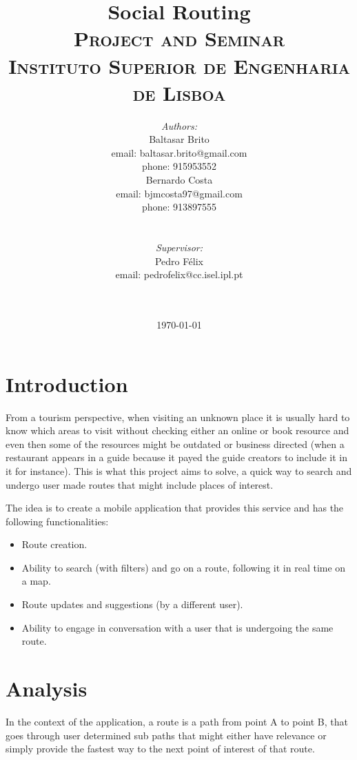 \documentclass{article}
\title{\vspace{-4.0cm}
    {\Huge Social Routing}\\[0.5cm]    
    \textsc{\Large Project and Seminar}\\[0.5cm]
    \textsc{\large Instituto Superior de Engenharia de Lisboa}\\[0.5cm]
}
\date{\today}
\author{   
    \begin{minipage}{0.4\textwidth}
        \begin{flushleft} \large
        \emph{Authors:}\\
        Baltasar Brito\\
        {\small email: baltasar.brito@gmail.com}\\
        {\small phone: 915953552}\\
        Bernardo Costa\\
        {\small email: bjmcosta97@gmail.com}\\
        {\small phone: 913897555}\\
        \end{flushleft}
    \end{minipage}
    ~
    \begin{minipage}{0.4\textwidth}
        \begin{flushright} \large
        \emph{Supervisor:} \\ 
        Pedro Félix\\
        {\small email: pedrofelix@cc.isel.ipl.pt}\\  
        \end{flushright}
    \end{minipage}\\[2cm]  
}
\begin{document}
     
    
    \maketitle
 
    \section*{Introduction} 


        From a tourism perspective, when visiting an unknown place it is usually hard to know which areas to visit without 
        checking either an online or book resource and even then some of the resources might be outdated or business directed 
        (when a restaurant appears in a guide because it payed the guide creators to include it in it for instance). 
        This is what this project aims to solve, a quick way to search and undergo user made routes that might include places
        of interest.     

        The idea is to create a mobile application that provides this service and has the following functionalities:
        \begin{itemize}
            \item Route creation.
            \item Ability to search (with filters) and go on a route, following it in real time on a map.
            \item Route updates and suggestions (by a different user).
            \item Ability to engage in conversation with a user that is undergoing the same route.  
        \end{itemize}

    

    \newpage
    

    \section*{Analysis}

        In the context of the application, a route is a path from point A to point B, that goes through user determined sub paths
        that might either have relevance or simply provide the fastest way to the next point of interest of that route. 
\end{document}
